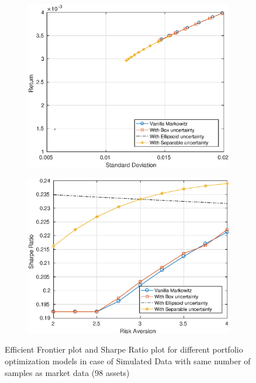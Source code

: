 \documentclass[12pt]{article}
\numberwithin{equation}{section}
\begin{document}
\begin{figure}[h]
\centering
\begin{subfigure}{.5\textwidth}
  \centering
  \includegraphics[width=.8\linewidth]{100_ef_ideal_range_exact_sim.eps}
\end{subfigure}%
\begin{subfigure}{.5\textwidth}
  \centering
  \includegraphics[width=.8\linewidth]{100_sr_ideal_range_exact_sim.eps}
\end{subfigure}
\caption{Efficient Frontier plot and Sharpe Ratio plot for different portfolio optimization models in case of Simulated Data with same number of samples as market data (98 assets)}
\label{fig:5}
\end{figure}
\end{document}
